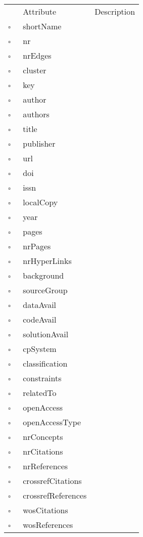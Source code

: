 \begin{table}
\caption{Work  }

\begin{longtable}{llp{8cm}}
& Attribute & Description \\
$\square$\ & shortName &  \\
$\square$\ & nr &  \\
$\square$\ & nrEdges &  \\
$\square$\ & cluster &  \\
$\square$\ & key &  \\
$\square$\ & author &  \\
$\square$\ & authors &  \\
$\square$\ & title &  \\
$\square$\ & publisher &  \\
$\square$\ & url &  \\
$\square$\ & doi &  \\
$\square$\ & issn &  \\
$\square$\ & localCopy &  \\
$\square$\ & year &  \\
$\square$\ & pages &  \\
$\square$\ & nrPages &  \\
$\square$\ & nrHyperLinks &  \\
$\square$\ & background &  \\
$\square$\ & sourceGroup &  \\
$\square$\ & dataAvail &  \\
$\square$\ & codeAvail &  \\
$\square$\ & solutionAvail &  \\
$\square$\ & cpSystem &  \\
$\square$\ & classification &  \\
$\square$\ & constraints &  \\
$\square$\ & relatedTo &  \\
$\square$\ & openAccess &  \\
$\square$\ & openAccessType &  \\
$\square$\ & nrConcepts &  \\
$\square$\ & nrCitations &  \\
$\square$\ & nrReferences &  \\
$\square$\ & crossrefCitations &  \\
$\square$\ & crossrefReferences &  \\
$\square$\ & wosCitations &  \\
$\square$\ & wosReferences &  \\

\end{longtable}
\end{table}
